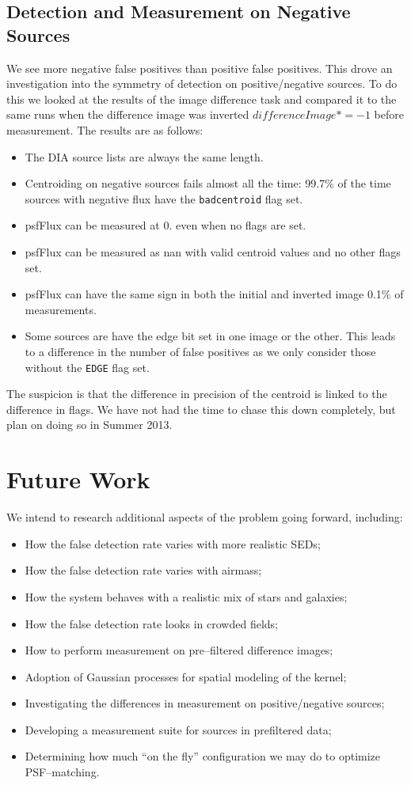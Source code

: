 \documentclass[prd, nofootinbib, floatfix, 11pt,tightenlines,times]{article}
\begin{document}
\subsection{Detection and Measurement on Negative Sources}
We see more negative false positives than positive false positives.  This drove an investigation 
into the symmetry of detection on positive/negative sources.  To do this we looked at the results 
of the image difference task and compared it to the same runs when the difference image was inverted
$differenceImage *= -1$ before measurement.  The results are as follows:
\begin{itemize}
\item The DIA source lists are always the same length.
\item Centroiding on negative sources fails almost all the time: 99.7\% of the time sources with negative flux
have the {\tt badcentroid} flag set.
\item psfFlux can be measured at 0. even when no flags are set.
\item psfFlux can be measured as nan with valid centroid values and no other flags set.
\item psfFlux can have the same sign in both the initial and inverted image 0.1\% of measurements.
\item Some sources are have the edge bit set in one image or the other.  This leads to a difference in 
the number of false positives as we only consider those without the {\tt EDGE} flag set.
\end{itemize}

The suspicion is that the difference in precision of the centroid is linked to the difference in flags.
We have not had the time to chase this down completely, but plan on doing so in Summer 2013.


\section{Future Work}

We intend to research additional aspects of the problem going forward,
including:
\begin{itemize}
\item How the false detection rate varies with more realistic SEDs;
\item How the false detection rate varies with airmass;
\item How the system behaves with a realistic mix of stars and galaxies;
\item How the false detection rate looks in crowded fields;
\item How to perform measurement on pre--filtered difference images;
\item Adoption of Gaussian processes for spatial modeling of the kernel;
\item Investigating the differences in measurement on positive/negative sources;
\item Developing a measurement suite for sources in prefiltered data;
\item Determining how much ``on the fly'' configuration we may do to optimize PSF--matching.
\end{itemize}
\end{document}
